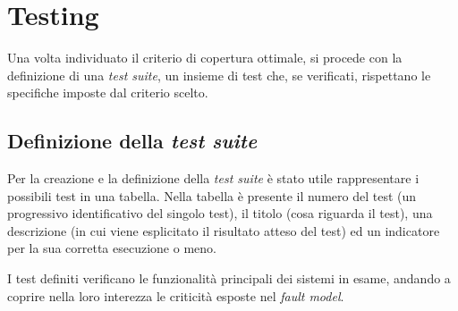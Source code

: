 \section{Testing}

Una volta individuato il criterio di copertura ottimale, si procede con la definizione di una \emph{test suite}, un insieme di test che, se verificati, rispettano le specifiche imposte dal criterio scelto.

\subsection{Definizione della \emph{test suite}}

Per la creazione e la definizione della \emph{test suite} è stato utile rappresentare i possibili test in una tabella. Nella tabella è presente il numero del test (un progressivo identificativo del singolo test), il titolo (cosa riguarda il test), una descrizione (in cui viene esplicitato il risultato atteso del test) ed un indicatore per la sua corretta esecuzione o meno.

I test definiti verificano le funzionalità principali dei sistemi in esame, andando a coprire nella loro interezza le criticità esposte nel \emph{fault model}.

